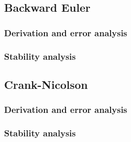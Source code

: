 \documentclass[12pt,english,a4paper]{article}
\begin{document}
\subsection{Backward Euler}

\subsubsection{Derivation and error analysis}

\subsubsection{Stability analysis}




%
\subsection{Crank-Nicolson}

\subsubsection{Derivation and error analysis}

\subsubsection{Stability analysis}




\clearpage
{}
\printbibliography
\end{document}
